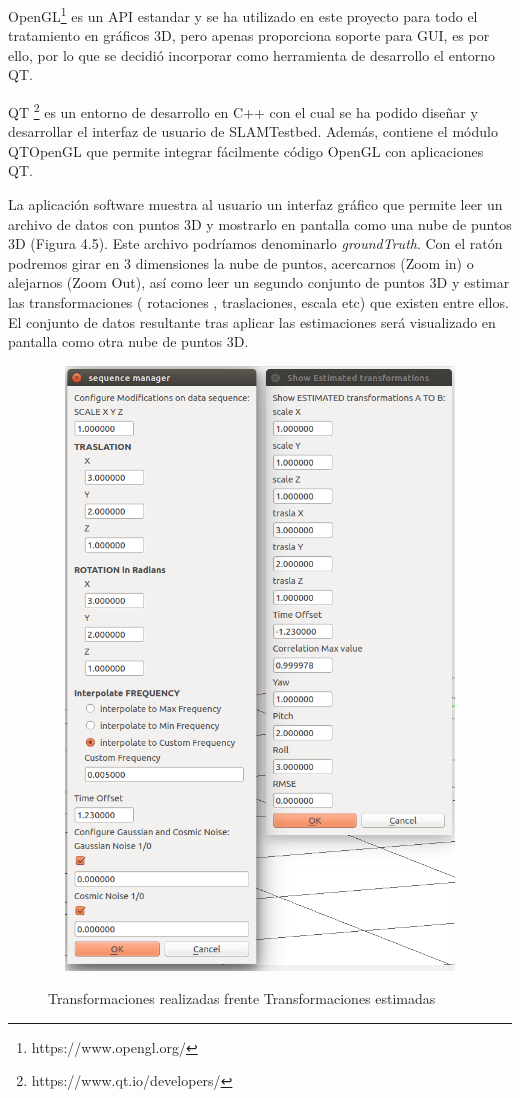 OpenGL\footnote{https://www.opengl.org/} es un API estandar y se ha utilizado en este proyecto para todo el tratamiento en gráficos 3D, pero apenas proporciona soporte para GUI, es por ello, por lo que se decidió incorporar como herramienta de desarrollo el entorno QT. 

QT \footnote{https://www.qt.io/developers/} es un entorno de desarrollo en C++ con el cual se ha podido diseñar y desarrollar el interfaz de usuario de SLAMTestbed. Además, contiene el módulo QTOpenGL que permite integrar fácilmente código OpenGL con aplicaciones QT.

La aplicación software muestra al usuario un interfaz gráfico que permite leer un archivo de datos con puntos 3D y mostrarlo en pantalla como una nube de puntos 3D (Figura 4.5). Este archivo podríamos denominarlo \textit{groundTruth}.
Con el ratón podremos girar en 3 dimensiones la nube de puntos, acercarnos  (Zoom in) o alejarnos (Zoom Out), así como leer un segundo conjunto de puntos 3D y estimar las transformaciones ( rotaciones , traslaciones, escala etc) que existen entre ellos. El conjunto de datos resultante tras aplicar las estimaciones será visualizado en pantalla como otra nube de puntos 3D.

\begin{figure}[H]
\begin{center}
\label{fig:Transformaciones versus Estimaciones}\includegraphics[height=16.0cm,width=12.0cm]{img/cap5/showTransformationsEstimated2.png}
\hspace{0.5cm}
\end{center}
\caption{Transformaciones realizadas frente Transformaciones estimadas }
\end{figure}


